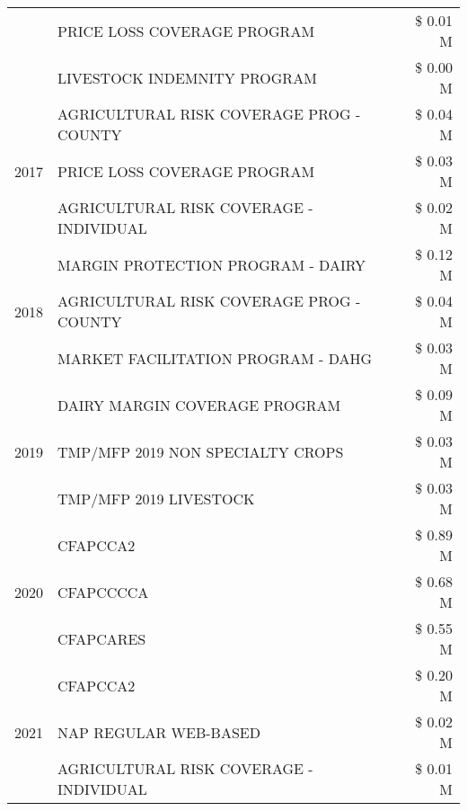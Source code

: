 \begin{tabular}{llr}
 & PRICE LOSS COVERAGE PROGRAM & \$ 0.01 M \\
 & LIVESTOCK INDEMNITY PROGRAM & \$ 0.00 M \\
\cline{1-3}
\multirow[t]{3}{*}{2017} & AGRICULTURAL RISK COVERAGE PROG - COUNTY & \$ 0.04 M \\
 & PRICE LOSS COVERAGE PROGRAM & \$ 0.03 M \\
 & AGRICULTURAL RISK COVERAGE - INDIVIDUAL & \$ 0.02 M \\
\cline{1-3}
\multirow[t]{3}{*}{2018} & MARGIN PROTECTION PROGRAM - DAIRY & \$ 0.12 M \\
 & AGRICULTURAL RISK COVERAGE PROG - COUNTY & \$ 0.04 M \\
 & MARKET FACILITATION PROGRAM - DAHG & \$ 0.03 M \\
\cline{1-3}
\multirow[t]{3}{*}{2019} & DAIRY MARGIN COVERAGE PROGRAM & \$ 0.09 M \\
 & TMP/MFP 2019 NON SPECIALTY CROPS & \$ 0.03 M \\
 & TMP/MFP 2019 LIVESTOCK & \$ 0.03 M \\
\cline{1-3}
\multirow[t]{3}{*}{2020} & CFAPCCA2 & \$ 0.89 M \\
 & CFAPCCCCA & \$ 0.68 M \\
 & CFAPCARES & \$ 0.55 M \\
\cline{1-3}
\multirow[t]{3}{*}{2021} & CFAPCCA2 & \$ 0.20 M \\
 & NAP REGULAR WEB-BASED & \$ 0.02 M \\
 & AGRICULTURAL RISK COVERAGE - INDIVIDUAL & \$ 0.01 M \\
\cline{1-3}
\bottomrule
\end{tabular}
